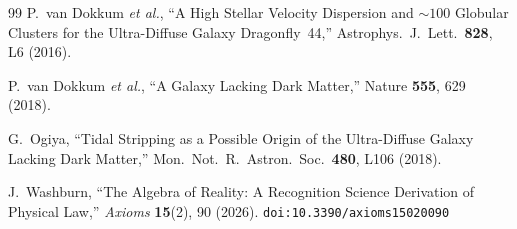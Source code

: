 \documentclass[12pt,a4paper]{article}
\theoremstyle{definition}
\theoremstyle{remark}
\begin{document}
\begin{thebibliography}{99}
P.~van Dokkum \textit{et al.}, ``A High Stellar Velocity
Dispersion and $\sim 100$ Globular Clusters for the Ultra-Diffuse Galaxy Dragonfly~44,'' Astrophys.\ J.\ Lett.\
\textbf{828}, L6 (2016).

P.~van Dokkum \textit{et al.}, ``A Galaxy Lacking Dark
Matter,'' Nature \textbf{555}, 629 (2018).

G.~Ogiya, ``Tidal Stripping as a Possible Origin of the
Ultra-Diffuse Galaxy Lacking Dark Matter,'' Mon.\ Not.\
R.\ Astron.\ Soc.\ \textbf{480}, L106 (2018).

J.~Washburn, ``The Algebra of Reality: A Recognition Science Derivation
of Physical Law,'' \emph{Axioms} \textbf{15}(2), 90 (2026).
\texttt{doi:10.3390/axioms15020090}

\end{thebibliography}
\end{document}
